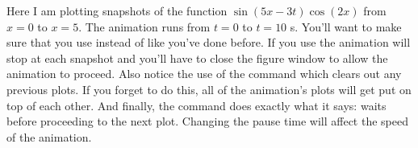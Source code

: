 Here I am plotting snapshots of the function $\sin(5 x - 3 t) \cos(2
x)$ from $x = 0$ to $x=5$.  The animation runs from $t=0$ to $t=10$ s.
You'll want to make sure that you use  instead of
 like you've done before.  If you use
 the animation will stop at each snapshot and
you'll have to close the figure window to allow the animation to
proceed.  Also notice the use of the  command which
clears out any previous plots.  If you forget to do this, all of the
animation's plots will get put on top of each other.  And finally, the
 command does exactly what it says: waits
before proceeding to the next plot. Changing the pause time will affect the speed of
the animation.
